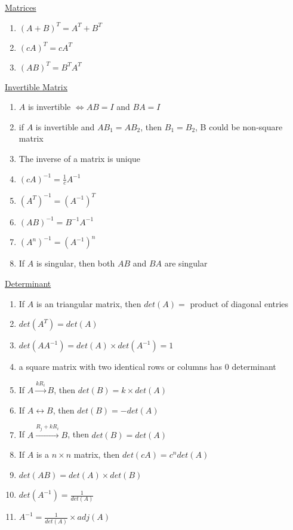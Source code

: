 \documentclass[a4paper,1pt,landscape]{article}
\begin{document}
\raggedright
\begin{multicols}{3}


\setlength{\columnseprule}{0.25pt}
\setlength{\premulticols}{1pt}
\setlength{\postmulticols}{1pt}
\setlength{\multicolsep}{1pt}
\setlength{\columnsep}{2pt}

\underline{Matrices}
\begin{enumerate}
\item \((A+B)^T = A^T + B^T\) 
\item \((cA)^T = cA^T\) 
\item \((AB)^T = B^TA^T\)
\end{enumerate}

\underline{Invertible Matrix}

\begin{enumerate}
\item \(A\) is invertible \(\Leftrightarrow AB = I \) and \(BA = I\)
\item if \(A\) is invertible and \(AB_1 = AB_2\), then \(B_1 = B_2\), B could be non-square matrix
\item The inverse of a matrix is unique
\item \((cA)^{-1} = \frac{1}{c} A^{-1}\)
\item \((A^T)^{-1} = (A^{-1})^T\)
\item \((AB)^{-1} = B^{-1}A^{-1}\)
\item \((A^n)^{-1} = (A^{-1})^n\)
\item If \(A\) is singular, then both \(AB\) and \(BA\) are singular
\end{enumerate}

\underline{Determinant}

\begin{enumerate}
\item If \(A\) is an triangular matrix, then \(det(A) = \) product of diagonal entries
\item \(det(A^T) = det(A)\)
\item \(det(AA^{-1}) = det(A) \times det(A^{-1}) = 1\)
\item a square matrix with two identical rows or columns has \(0\) determinant
\item If \(A \xrightarrow{kR_i} B\), then \(det(B) = k \times det(A)\)
\item If \(A \leftrightarrow B\), then \(det(B) = -det(A)\)
\item If \(A \xrightarrow{R_j + kR_i} B\), then \(det(B) = det(A)\)
\item If \(A\) is a \(n \times n\) matrix, then \(det(cA) = c^n det(A)\)
\item \(det(AB) = det(A) \times det(B)\)
\item \(det(A^{-1}) = \frac{1}{det(A)}\)
\item \(A^{-1} = \frac{1}{det(A)} \times adj(A)\)
\end{enumerate}\


\end{multicols}
\end{document}
